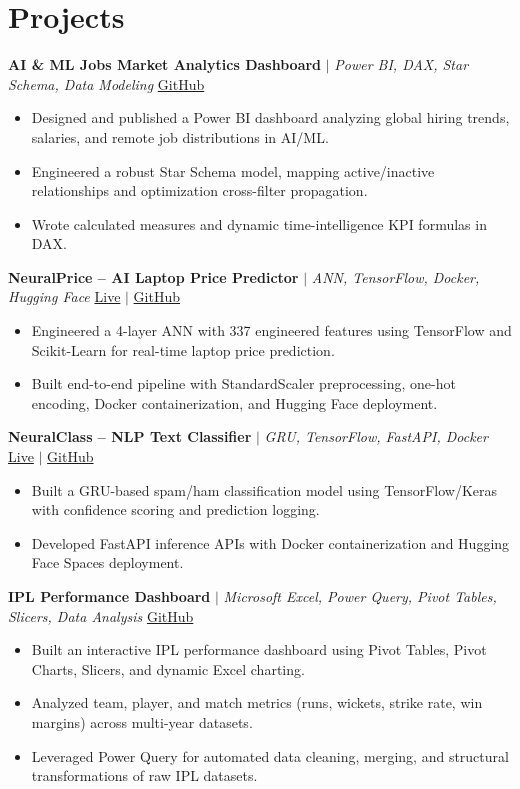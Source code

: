 \documentclass[a4paper,9pt]{article}
\newcommand{\resumeItem}[1]{\item\small #1}
\begin{document}
\vspace{-2mm}

\section{Projects}

\noindent\textbf{AI \& ML Jobs Market Analytics Dashboard} $|$ \textit{Power BI, DAX, Star Schema, Data Modeling} \hfill
\href{https://github.com/hsachan295-source/Power-BI-Portfolio}{\small GitHub}
\begin{itemize}
\resumeItem{Designed and published a Power BI dashboard analyzing global hiring trends, salaries, and remote job distributions in AI/ML.}
\resumeItem{Engineered a robust Star Schema model, mapping active/inactive relationships and optimization cross-filter propagation.}
\resumeItem{Wrote calculated measures and dynamic time-intelligence KPI formulas in DAX.}
\end{itemize}

\vspace{1.5pt}
\noindent\textbf{NeuralPrice -- AI Laptop Price Predictor} $|$ \textit{ANN, TensorFlow, Docker, Hugging Face} \hfill
\href{https://huggingface.co/spaces/Harsh0809/laptop-price-predictor-Ann}{\small Live} $|$
\href{https://github.com/hsachan295-source/Laptop-Price-Prediction-ANN}{\small GitHub}
\begin{itemize}
\resumeItem{Engineered a 4-layer ANN with 337 engineered features using TensorFlow and Scikit-Learn for real-time laptop price prediction.}
\resumeItem{Built end-to-end pipeline with StandardScaler preprocessing, one-hot encoding, Docker containerization, and Hugging Face deployment.}
\end{itemize}

\vspace{1.5pt}
\noindent\textbf{NeuralClass -- NLP Text Classifier} $|$ \textit{GRU, TensorFlow, FastAPI, Docker} \hfill
\href{https://huggingface.co/spaces/Harsh0809/gru-text-classifier}{\small Live} $|$
\href{https://github.com/hsachan295-source/Email-Spam-Detector}{\small GitHub}
\begin{itemize}
\resumeItem{Built a GRU-based spam/ham classification model using TensorFlow/Keras with confidence scoring and prediction logging.}
\resumeItem{Developed FastAPI inference APIs with Docker containerization and Hugging Face Spaces deployment.}
\end{itemize}

\vspace{1.5pt}
\noindent\textbf{IPL Performance Dashboard} $|$ \textit{Microsoft Excel, Power Query, Pivot Tables, Slicers, Data Analysis} \hfill
\href{https://github.com/hsachan295-source/Power-BI-Portfolio}{\small GitHub}
\begin{itemize}
\resumeItem{Built an interactive IPL performance dashboard using Pivot Tables, Pivot Charts, Slicers, and dynamic Excel charting.}
\resumeItem{Analyzed team, player, and match metrics (runs, wickets, strike rate, win margins) across multi-year datasets.}
\resumeItem{Leveraged Power Query for automated data cleaning, merging, and structural transformations of raw IPL datasets.}
\end{itemize}
\end{document}
